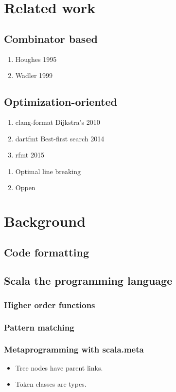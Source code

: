 \documentclass[11pt,a4paper]{article}
\begin{document}
\section{Related work}
\subsection{Combinator based}
\begin{enumerate}
  \item Houghes 1995
  \item Wadler 1999
\end{enumerate}
\subsection{Optimization-oriented}
\begin{enumerate}
  \item clang-format Dijkstra's 2010
  \item dartfmt Best-first search 2014
  \item rfmt 2015
\end{enumerate}
\begin{enumerate}
  \item Optimal line breaking
  \item Oppen
\end{enumerate}
\section{Background}
\subsection{Code formatting}
\subsection{Scala the programming language}
\subsubsection{Higher order functions}
\subsubsection{Pattern matching}
\subsubsection{Metaprogramming with scala.meta}
\begin{itemize}
  \item Tree nodes have parent links.
  \item Token classes are types.
\end{itemize}
\end{document}
